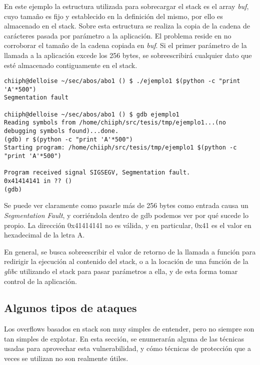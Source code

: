 En este ejemplo la estructura utilizada para sobrecargar el stack es el array {\em buf}, cuyo tama\~no es fijo y establecido en la definici\'on del mismo, por ello es almacenado en el stack. Sobre esta estructura se realiza la copia de la cadena de car\'acteres pasada por par\'ametro a la aplicaci\'on. El problema reside en no corroborar el tama\~no de la cadena copiada en {\em buf}. Si el primer par\'ametro de la llamada a la aplicaci\'on excede los 256 bytes, se sobreescribir\'a cualquier dato que est\'e almacenado contiguamente en el stack. 

	\vspace{5 mm}
	
\begin{lstlisting}
chiiph@delloise ~/sec/abos/abo1 () $ ./ejemplo1 $(python -c "print 'A'*500")
Segmentation fault

chiiph@delloise ~/sec/abos/abo1 () $ gdb ejemplo1
Reading symbols from /home/chiiph/src/tesis/tmp/ejemplo1...(no debugging symbols found)...done.
(gdb) r $(python -c "print 'A'*500")
Starting program: /home/chiiph/src/tesis/tmp/ejemplo1 $(python -c "print 'A'*500")

Program received signal SIGSEGV, Segmentation fault.
0x41414141 in ?? ()
(gdb)
\end{lstlisting}

	\vspace{5 mm}
	
Se puede ver claramente como pasarle m\'as de 256 bytes como entrada causa un {\em Segmentation Fault}, y corri\'endola dentro de gdb podemos ver por qu\'e sucede lo propio. La direcci\'on 0x41414141 no es v\'alida, y en particular, 0x41 es el valor en hexadecimal de la letra A.

En general, se busca sobreescribir el valor de retorno de la llamada a funci\'on para redirigir la ejecuci\'on al contenido del stack, o a la locaci\'on de una funci\'on de la {\em glibc} utilizando el stack para pasar par\'ametros a ella, y de esta forma tomar control de la aplicaci\'on.

	\subsection{Algunos tipos de ataques}
	
	Los overflows basados en stack son muy simples de entender, pero no siempre son tan simples de explotar. En esta secci\'on, se enumerar\'an alguna de las t\'ecnicas usadas para aprovechar esta vulnerabilidad, y c\'omo t\'ecnicas de protecci\'on que a veces se utilizan no son realmente \'utiles.
	
